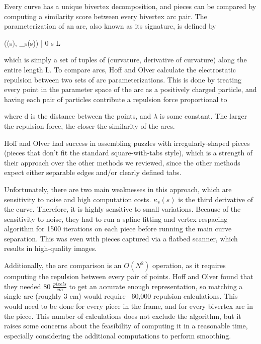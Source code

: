 \documentclass[12pt]{report}
\begin{document}
Every curve has a unique bivertex decomposition, and pieces can be compared by computing a similarity score between every bivertex arc pair. The parameterization of an arc, also known as its signature, is defined by
\begin{large_eq}
\left\lbrace(\kappa(s), \kappa_s(s)) | 0 \leq s \leq L\right\rbrace
\end{large_eq}
which is simply a set of tuples of (curvature, derivative of curvature) along the entire length L.
To compare arcs, Hoff and Olver calculate the electrostatic repulsion between two sets of arc parameterizations. This is done by treating every point in the parameter space of the arc as a positively charged particle, and having each pair of particles contribute a repulsion force proportional to
\begin{large_eq}
\end{large_eq}
where d is the distance between the points, and $\lambda$ is some constant. The larger the repulsion force, the closer the similarity of the arcs.

Hoff and Olver had success in assembling puzzles with irregularly-shaped pieces (pieces that don't fit the standard square-with-tabs style), which is a strength of their approach over the other methods we reviewed, since the other methods expect either separable edges and/or clearly defined tabs.

Unfortunately, there are two main weaknesses in this approach, which are sensitivity to noise and high computation costs. $\kappa_s(s)$ is the third derivative of the curve. Therefore, it is highly sensitive to small variations. Because of the sensitivity to noise, they had to run a spline fitting and vertex respacing algorithm for 1500 iterations on each piece before running the main curve separation. This was even with pieces captured via a flatbed scanner, which results in high-quality images.

Additionally, the arc comparison is an $O(N^2)$ operation, as it requires computing the repulsion between every pair of points. Hoff and Olver found that they needed 80 $\frac{pixels}{cm}$ to get an accurate enough representation, so matching a single arc (roughly 3 cm) would require ~60,000 repulsion calculations. This would need to be done for every piece in the frame, and for every bivertex arc in the piece. This number of calculations does not exclude the algorithm, but it raises some concerns about the feasibility of computing it in a reasonable time, especially considering the additional computations to perform smoothing.
\end{document}
